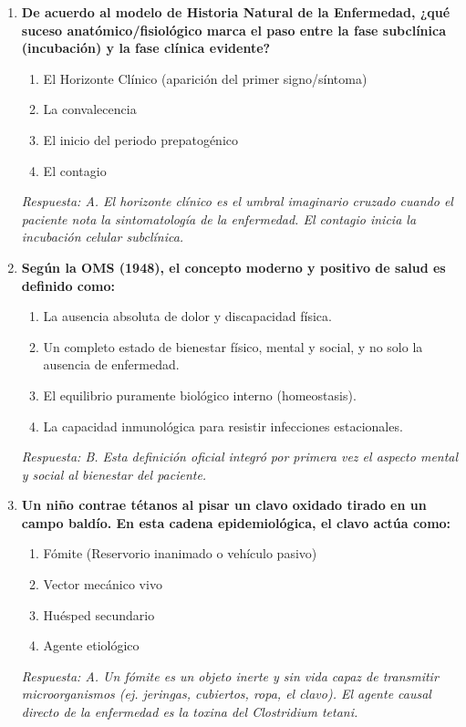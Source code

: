 \documentclass[spanish,letterpaper,oneside]{article}
\begin{document}
\begin{enumerate}[label=\textbf{\arabic*.}]
    \item \textbf{De acuerdo al modelo de Historia Natural de la Enfermedad, ¿qué suceso anatómico/fisiológico marca el paso entre la fase subclínica (incubación) y la fase clínica evidente?}
    \begin{enumerate}
        \item[A)] El Horizonte Clínico (aparición del primer signo/síntoma)
        \item[B)] La convalecencia
        \item[C)] El inicio del periodo prepatogénico
        \item[D)] El contagio
    \end{enumerate}
    \textit{Respuesta: A. El horizonte clínico es el umbral imaginario cruzado cuando el paciente nota la sintomatología de la enfermedad. El contagio inicia la incubación celular subclínica.}

    \item \textbf{Según la OMS (1948), el concepto moderno y positivo de salud es definido como:}
    \begin{enumerate}
        \item[A)] La ausencia absoluta de dolor y discapacidad física.
        \item[B)] Un completo estado de bienestar físico, mental y social, y no solo la ausencia de enfermedad.
        \item[C)] El equilibrio puramente biológico interno (homeostasis).
        \item[D)] La capacidad inmunológica para resistir infecciones estacionales.
    \end{enumerate}
    \textit{Respuesta: B. Esta definición oficial integró por primera vez el aspecto mental y social al bienestar del paciente.}

    \item \textbf{Un niño contrae tétanos al pisar un clavo oxidado tirado en un campo baldío. En esta cadena epidemiológica, el clavo actúa como:}
    \begin{enumerate}
        \item[A)] Fómite (Reservorio inanimado o vehículo pasivo)
        \item[B)] Vector mecánico vivo
        \item[C)] Huésped secundario
        \item[D)] Agente etiológico
    \end{enumerate}
    \textit{Respuesta: A. Un fómite es un objeto inerte y sin vida capaz de transmitir microorganismos (ej. jeringas, cubiertos, ropa, el clavo). El agente causal directo de la enfermedad es la toxina del Clostridium tetani.}


\end{enumerate}
\end{document}
